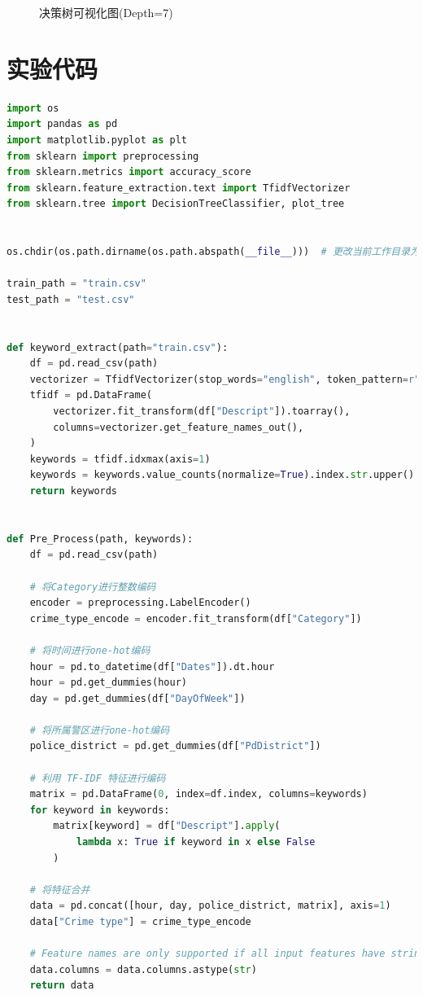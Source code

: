 \documentclass[a4paper,12pt]{report}
\begin{document}
\begin{figure}[htbp]
\begin{minipage}{0.42\textwidth}
        \caption{决策树可视化图(Depth=7)}
        \label{4.2}
    \end{minipage}
    \label{fig:train_test_comparison}
\end{figure}
\section{实验代码}
\begin{lstlisting}[language=Python]
import os
import pandas as pd
import matplotlib.pyplot as plt
from sklearn import preprocessing
from sklearn.metrics import accuracy_score
from sklearn.feature_extraction.text import TfidfVectorizer
from sklearn.tree import DecisionTreeClassifier, plot_tree


os.chdir(os.path.dirname(os.path.abspath(__file__)))  # 更改当前工作目录为脚本所在目录

train_path = "train.csv"
test_path = "test.csv"


def keyword_extract(path="train.csv"):
    df = pd.read_csv(path)
    vectorizer = TfidfVectorizer(stop_words="english", token_pattern=r"(?u)\b\w+\b")
    tfidf = pd.DataFrame(
        vectorizer.fit_transform(df["Descript"]).toarray(),
        columns=vectorizer.get_feature_names_out(),
    )
    keywords = tfidf.idxmax(axis=1)
    keywords = keywords.value_counts(normalize=True).index.str.upper().tolist()
    return keywords


def Pre_Process(path, keywords):
    df = pd.read_csv(path)

    # 将Category进行整数编码
    encoder = preprocessing.LabelEncoder()
    crime_type_encode = encoder.fit_transform(df["Category"])

    # 将时间进行one-hot编码
    hour = pd.to_datetime(df["Dates"]).dt.hour
    hour = pd.get_dummies(hour)
    day = pd.get_dummies(df["DayOfWeek"])

    # 将所属警区进行one-hot编码
    police_district = pd.get_dummies(df["PdDistrict"])

    # 利用 TF-IDF 特征进行编码
    matrix = pd.DataFrame(0, index=df.index, columns=keywords)
    for keyword in keywords:
        matrix[keyword] = df["Descript"].apply(
            lambda x: True if keyword in x else False
        )

    # 将特征合并
    data = pd.concat([hour, day, police_district, matrix], axis=1)
    data["Crime type"] = crime_type_encode

    # Feature names are only supported if all input features have string names
    data.columns = data.columns.astype(str)
    return data



\end{lstlisting}
\end{document}
